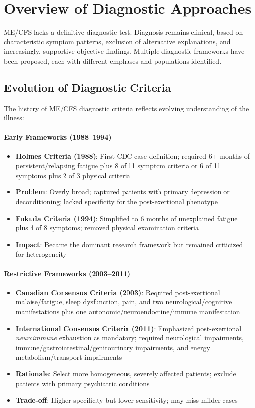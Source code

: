 \section{Overview of Diagnostic Approaches}
\label{sec:diagnostic-overview}

ME/CFS lacks a definitive diagnostic test. Diagnosis remains clinical, based on characteristic symptom patterns, exclusion of alternative explanations, and increasingly, supportive objective findings. Multiple diagnostic frameworks have been proposed, each with different emphases and populations identified.

\subsection{Evolution of Diagnostic Criteria}

The history of ME/CFS diagnostic criteria reflects evolving understanding of the illness:

\paragraph{Early Frameworks (1988--1994)}
\begin{itemize}
    \item \textbf{Holmes Criteria (1988)}: First CDC case definition; required 6+ months of persistent/relapsing fatigue plus 8 of 11 symptom criteria or 6 of 11 symptoms plus 2 of 3 physical criteria
    \item \textbf{Problem}: Overly broad; captured patients with primary depression or deconditioning; lacked specificity for the post-exertional phenotype
    \item \textbf{Fukuda Criteria (1994)}: Simplified to 6 months of unexplained fatigue plus 4 of 8 symptoms; removed physical examination criteria
    \item \textbf{Impact}: Became the dominant research framework but remained criticized for heterogeneity
\end{itemize}

\paragraph{Restrictive Frameworks (2003--2011)}
\begin{itemize}
    \item \textbf{Canadian Consensus Criteria (2003)}: Required post-exertional malaise/fatigue, sleep dysfunction, pain, and two neurological/cognitive manifestations plus one autonomic/neuroendocrine/immune manifestation
    \item \textbf{International Consensus Criteria (2011)}: Emphasized post-exertional \textit{neuroimmune} exhaustion as mandatory; required neurological impairments, immune/gastrointestinal/genitourinary impairments, and energy metabolism/transport impairments
    \item \textbf{Rationale}: Select more homogeneous, severely affected patients; exclude patients with primary psychiatric conditions
    \item \textbf{Trade-off}: Higher specificity but lower sensitivity; may miss milder cases
\end{itemize}

